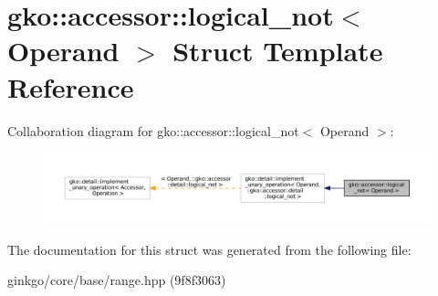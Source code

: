 \hypertarget{structgko_1_1accessor_1_1logical__not}{}\section{gko\+:\+:accessor\+:\+:logical\+\_\+not$<$ Operand $>$ Struct Template Reference}
\label{structgko_1_1accessor_1_1logical__not}


Collaboration diagram for gko\+:\+:accessor\+:\+:logical\+\_\+not$<$ Operand $>$\+:
\nopagebreak
\begin{figure}[H]
\begin{center}
\leavevmode
\includegraphics[width=350pt]{structgko_1_1accessor_1_1logical__not__coll__graph}
\end{center}
\end{figure}


The documentation for this struct was generated from the following file\+:\begin{DoxyCompactItemize}
\item 
ginkgo/core/base/range.\+hpp (9f8f3063)\end{DoxyCompactItemize}
